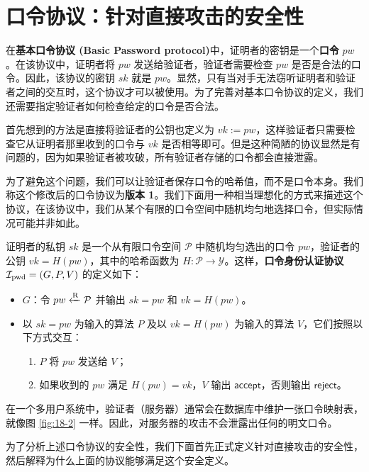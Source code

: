 \section{口令协议：针对直接攻击的安全性}\label{sec:18-3}

在\textbf{基本口令协议 (Basic Password protocol)}中，证明者的密钥是一个\textbf{口令} $pw$。在该协议中，证明者将 $pw$ 发送给验证者，验证者需要检查 $pw$ 是否是合法的口令。因此，该协议的密钥 $sk$ 就是 $pw$。显然，只有当对手无法窃听证明者和验证者之间的交互时，这个协议才可以被使用。为了完善对基本口令协议的定义，我们还需要指定验证者如何检查给定的口令是否合法。

首先想到的方法是直接将验证者的公钥也定义为 $vk:=pw$，这样验证者只需要检查它从证明者那里收到的口令与 $vk$ 是否相等即可。但是这种简陋的协议显然是有问题的，因为如果验证者被攻破，所有验证者存储的口令都会直接泄露。

为了避免这个问题，我们可以让验证者保存口令的哈希值，而不是口令本身。我们称这个修改后的口令协议为\textbf{版本 1}。我们下面用一种相当理想化的方式来描述这个协议，在该协议中，我们从某个有限的口令空间中随机均匀地选择口令，但实际情况可能并非如此。

\begin{snote}[口令协议版本 1.]
证明者的私钥 $sk$ 是一个从有限口令空间 $\mathcal P$ 中随机均匀选出的口令 $pw$，验证者的公钥 $vk=H(pw)$，其中的哈希函数为 $H:\mathcal{P}\to\mathcal{Y}$。这样，\textbf{口令身份认证协议} $\mathcal{I}_{\rm pwd}=(G,P,V)$ 的定义如下：
\begin{itemize}
    \item $G$：令 $pw\xleftarrow{\rm R}\mathcal{P}$ 并输出 $sk=pw$ 和 $vk=H(pw)$。
    \item 以 $sk=pw$ 为输入的算法 $P$ 及以 $vk=H(pw)$ 为输入的算法 $V$，它们按照以下方式交互：
    \begin{enumerate}
        \item $P$ 将 $pw$ 发送给 $V$；
        \item 如果收到的 $pw$ 满足 $H(pw)=vk$，$V$ 输出 $\mathsf{accept}$，否则输出 $\mathsf{reject}$。
    \end{enumerate}
\end{itemize}

在一个多用户系统中，验证者（服务器）通常会在数据库中维护一张口令映射表，就像图 \ref{fig:18-2} 一样。因此，对服务器的攻击不会泄露出任何的明文口令。

为了分析上述口令协议的安全性，我们下面首先正式定义针对直接攻击的安全性，然后解释为什么上面的协议能够满足这个安全定义。
\end{snote}

